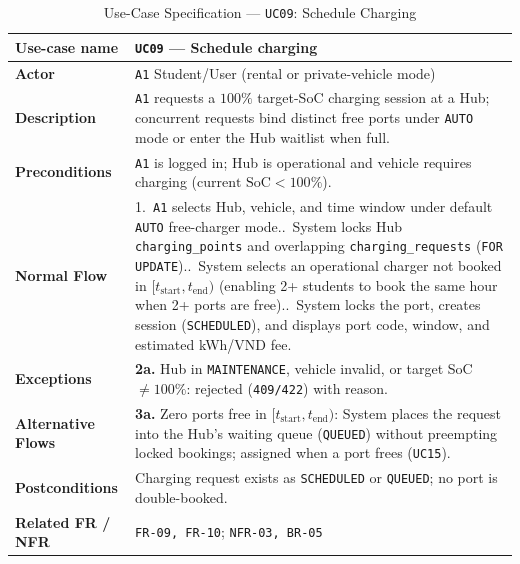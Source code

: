 \begin{table}[H]
  \centering
  \singlespacing\footnotesize
  \caption{Use-Case Specification --- \texttt{UC09}: Schedule Charging}
  \label{tab:uc09}
  \renewcommand{\arraystretch}{1.13}
  \begin{tabularx}{\textwidth}{|L{2.9cm}|Y|}
    \hline
    \textbf{Use-case name} & \textbf{\texttt{UC09} --- Schedule charging} \\
    \hline
    \textbf{Actor} & \texttt{A1} Student/User (rental or private-vehicle mode) \\
    \hline
    \textbf{Description} & \texttt{A1} requests a $100\%$ target-SoC charging session at a Hub; concurrent requests bind distinct free ports under \texttt{AUTO} mode or enter the Hub waitlist when full. \\
    \hline
    \textbf{Preconditions} & \texttt{A1} is logged in; Hub is operational and vehicle requires charging ($\text{current SoC} < 100\%$). \\
    \hline
    \textbf{Normal Flow} & 1.\ \texttt{A1} selects Hub, vehicle, and time window under default \texttt{AUTO} free-charger mode..\ System locks Hub \texttt{charging\_\allowbreak points} and overlapping \texttt{charging\_\allowbreak requests} (\texttt{FOR UPDATE})..\ System selects an operational charger not booked in $[t_{\text{start}}, t_{\text{end}})$ (enabling 2+ students to book the same hour when 2+ ports are free)..\ System locks the port, creates session (\texttt{SCHEDULED}), and displays port code, window, and estimated kWh/VND fee. \\
    \hline
    \textbf{Exceptions} & \textbf{2a.} Hub in \texttt{MAINTENANCE}, vehicle invalid, or target SoC $\neq 100\%$: rejected (\texttt{409/422}) with reason. \\
    \hline
    \textbf{Alternative Flows} & \textbf{3a.} Zero ports free in $[t_{\text{start}}, t_{\text{end}})$: System places the request into the Hub's waiting queue (\texttt{QUEUED}) without preempting locked bookings; assigned when a port frees (\texttt{UC15}). \\
    \hline
    \textbf{Postconditions} & Charging request exists as \texttt{SCHEDULED} or \texttt{QUEUED}; no port is double-booked. \\
    \hline
    \textbf{Related FR / NFR} & \texttt{FR-09, FR-10}; \texttt{NFR-03, BR-05} \\
    \hline
  \end{tabularx}
\end{table}

